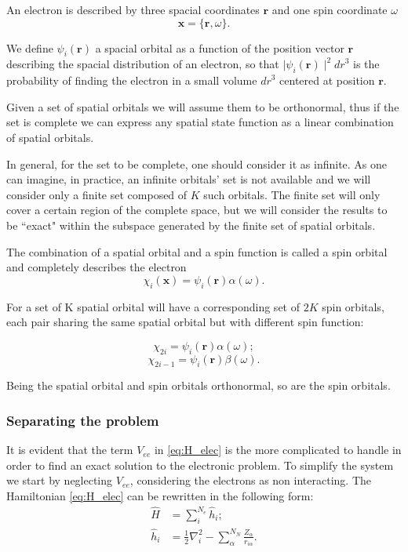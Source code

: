 \documentclass[a4paper,12pt]{article}
\begin{document}
An electron is described by three spacial coordinates $\mathbf{r}$ and one spin coordinate $\omega$
\begin{equation}
	\mathbf{x} = \{\mathbf{r},\omega\}.
\end{equation}

We define $\psi_i(\mathbf{r})$ a spacial orbital as a function of the position vector $\mathbf{r}$ describing the spacial distribution of an electron, so that $\mid\psi_i(\mathbf{r})\mid^2 {dr}^3$ is the probability of finding the electron in a small volume ${dr}^3$ centered at position $\mathbf{r}$.

Given a set of spatial orbitals we will assume them to be orthonormal, thus if the set is complete we can express any spatial state function as a linear combination of spatial orbitals.

In general, for the set to be complete, one should consider it as infinite. As one can imagine, in practice, an infinite orbitals' set is not available and we will consider only a finite set composed of $K$ such orbitals. The finite set will only cover a certain region of the complete space, but we will consider the results to be ``exact" within the subspace generated by the finite set of spatial orbitals.

The combination of a spatial orbital and a spin function is called a spin orbital and completely describes the electron
\begin{equation}
	\chi_{i}(\mathbf{x}) = \psi_i(\mathbf{r}) \alpha(\omega).
\end{equation}


For a set of K spatial orbital will have a corresponding set of $2K$ spin orbitals, each pair sharing the same spatial orbital but with different spin function:

\begin{equation}
	\chi_{2i} = \psi_i(\mathbf{r}) \alpha(\omega);
\end{equation}
\begin{equation}
	\chi_{2i-1} = \psi_i(\mathbf{r}) \beta(\omega).
\end{equation}

Being the spatial orbital and spin orbitals orthonormal, so are the spin orbitals.

\subsubsection{Separating the problem}

It is evident that the term $V_{ee}$ in \eqref{eq:H_elec} is the more complicated to handle in order to find an exact solution to the electronic problem.
To simplify the system we start by neglecting $V_{ee}$, considering the electrons as non interacting.
The Hamiltonian \eqref{eq:H_elec} can be rewritten in the following form:
\begin{align}
	\hat{H} & = \sum_{i}^{N_{e}} \hat{h}_{i}; \label{eq:HartreeHamiltonian} 
	\\
	\hat{h}_{i} & = \frac{1}{2} \nabla_{i}^2 - \sum_{\alpha}^{N_{N}} \frac{Z_{\alpha}}{r_{i\alpha}}.  \label{eq:singleElHam}
\end{align}
\end{document}
